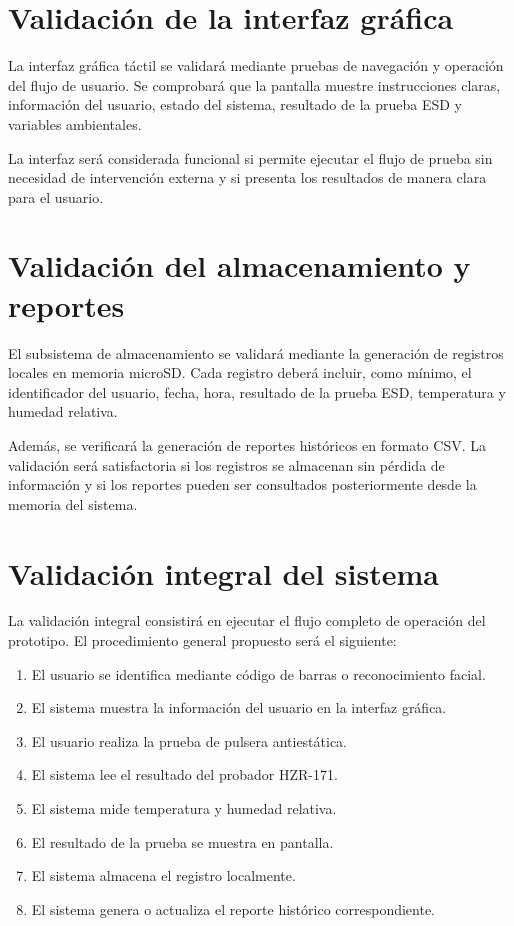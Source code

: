 \section{Validación de la interfaz gráfica}

La interfaz gráfica táctil se validará mediante pruebas de navegación y operación del flujo
de usuario. Se comprobará que la pantalla muestre instrucciones claras, información del
usuario, estado del sistema, resultado de la prueba ESD y variables ambientales.

La interfaz será considerada funcional si permite ejecutar el flujo de prueba sin necesidad
de intervención externa y si presenta los resultados de manera clara para el usuario.

\section{Validación del almacenamiento y reportes}

El subsistema de almacenamiento se validará mediante la generación de registros locales
en memoria microSD. Cada registro deberá incluir, como mínimo, el identificador del
usuario, fecha, hora, resultado de la prueba ESD, temperatura y humedad relativa.

Además, se verificará la generación de reportes históricos en formato CSV. La validación
será satisfactoria si los registros se almacenan sin pérdida de información y si los reportes
pueden ser consultados posteriormente desde la memoria del sistema.

\section{Validación integral del sistema}

La validación integral consistirá en ejecutar el flujo completo de operación del prototipo.
El procedimiento general propuesto será el siguiente:

\begin{enumerate}
    \item El usuario se identifica mediante código de barras o reconocimiento facial.
    \item El sistema muestra la información del usuario en la interfaz gráfica.
    \item El usuario realiza la prueba de pulsera antiestática.
    \item El sistema lee el resultado del probador HZR-171.
    \item El sistema mide temperatura y humedad relativa.
    \item El resultado de la prueba se muestra en pantalla.
    \item El sistema almacena el registro localmente.
    \item El sistema genera o actualiza el reporte histórico correspondiente.
\end{enumerate}

